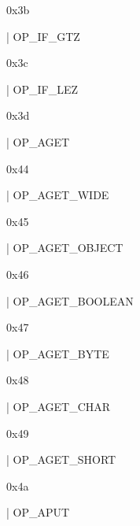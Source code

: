 \documentclass[11pt]{article}
\begin{document}
\begin{ocamldoccomment}
0x3b
\end{ocamldoccomment}
\begin{ocamldoccode}
  | OP_IF_GTZ
\end{ocamldoccode}
\begin{ocamldoccomment}
0x3c
\end{ocamldoccomment}
\begin{ocamldoccode}
  | OP_IF_LEZ
\end{ocamldoccode}
\begin{ocamldoccomment}
0x3d
\end{ocamldoccomment}
\begin{ocamldoccode}
  | OP_AGET
\end{ocamldoccode}
\begin{ocamldoccomment}
0x44
\end{ocamldoccomment}
\begin{ocamldoccode}
  | OP_AGET_WIDE
\end{ocamldoccode}
\begin{ocamldoccomment}
0x45
\end{ocamldoccomment}
\begin{ocamldoccode}
  | OP_AGET_OBJECT
\end{ocamldoccode}
\begin{ocamldoccomment}
0x46
\end{ocamldoccomment}
\begin{ocamldoccode}
  | OP_AGET_BOOLEAN
\end{ocamldoccode}
\begin{ocamldoccomment}
0x47
\end{ocamldoccomment}
\begin{ocamldoccode}
  | OP_AGET_BYTE
\end{ocamldoccode}
\begin{ocamldoccomment}
0x48
\end{ocamldoccomment}
\begin{ocamldoccode}
  | OP_AGET_CHAR
\end{ocamldoccode}
\begin{ocamldoccomment}
0x49
\end{ocamldoccomment}
\begin{ocamldoccode}
  | OP_AGET_SHORT
\end{ocamldoccode}
\begin{ocamldoccomment}
0x4a
\end{ocamldoccomment}
\begin{ocamldoccode}
  | OP_APUT
\end{ocamldoccode}
\end{document}
